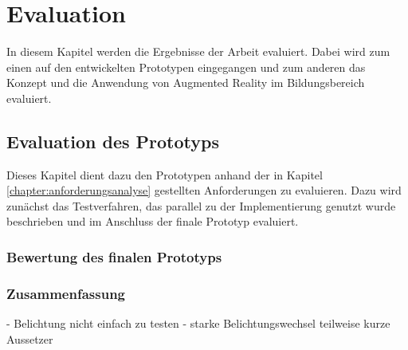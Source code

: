 \chapter{Evaluation}\label{chapter:evaluation}
In diesem Kapitel werden die Ergebnisse der Arbeit evaluiert. Dabei wird zum einen auf den entwickelten Prototypen eingegangen und zum anderen das Konzept und die Anwendung von Augmented Reality im Bildungsbereich evaluiert.

\section{Evaluation des Prototyps}
Dieses Kapitel dient dazu den Prototypen anhand der in Kapitel \ref{chapter:anforderungsanalyse} gestellten Anforderungen zu evaluieren. Dazu wird zunächst das Testverfahren, das parallel zu der Implementierung genutzt wurde beschrieben und im Anschluss der finale Prototyp evaluiert.

\subsection{Bewertung des finalen Prototyps}




\subsection{Zusammenfassung}\label{sec:Zusammenfassung}
- Belichtung nicht einfach zu testen
- starke Belichtungswechsel teilweise kurze Aussetzer

